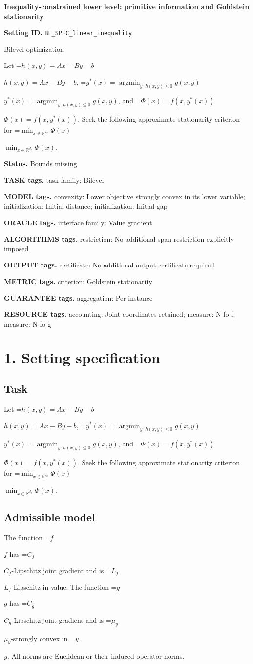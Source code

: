 \documentclass[10pt,a4paper]{article}
\newcommand{\AtlasMath}[1]{\par\begingroup\centering\setbox0=\hbox{$\displaystyle #1$}\ifdim\wd0>1.4\linewidth\typeout{ATLAS WIDE FORMULA: \the\wd0}\fi\ifdim\wd0>\linewidth\resizebox{\linewidth}{!}{\box0}\else\box0\fi\par\endgroup}
\newcommand{\AtlasInlineMath}[1]{\begingroup\setbox0=\hbox{$#1$}\ifdim\wd0>.4\linewidth\endgroup\AtlasMath{#1}\else\endgroup$#1$\fi}
\begin{document}
\raggedright

{\LARGE\bfseries\sffamily\color{AtlasNavy} Inequality-constrained lower level: primitive information and Goldstein stationarity\par}\vspace{5pt}
\textbf{Setting ID.} \texttt{BL\_\allowbreak{}SPEC\_\allowbreak{}linear\_\allowbreak{}inequality}

Bilevel optimization

Let \AtlasInlineMath{h(x,y)=Ax-By-b}, \AtlasInlineMath{y^*(x)=\operatorname*{argmin}_{y:\,h(x,y)\le0}g(x,y)}, and \AtlasInlineMath{\Phi(x)=f(x,y^*(x))}. Seek the following approximate stationarity criterion for \AtlasInlineMath{\min_{x\in \mathbb{R}^{d_x}}\Phi(x)}.

\textbf{Status.} Bounds missing

\textbf{TASK tags.} task family: Bilevel

\textbf{MODEL tags.} convexity: Lower objective strongly convex in its lower variable; initialization: Initial distance; initialization: Initial gap

\textbf{ORACLE tags.} interface family: Value gradient

\textbf{ALGORITHMS tags.} restriction: No additional span restriction explicitly imposed

\textbf{OUTPUT tags.} certificate: No additional output certificate required

\textbf{METRIC tags.} criterion: Goldstein stationarity

\textbf{GUARANTEE tags.} aggregation: Per instance

\textbf{RESOURCE tags.} accounting: Joint coordinates retained; measure: N fo f; measure: N fo g

\section{1. Setting specification}
\subsection{Task}
Let \AtlasInlineMath{h(x,y)=Ax-By-b}, \AtlasInlineMath{y^*(x)=\operatorname*{argmin}_{y:\,h(x,y)\le0}g(x,y)}, and \AtlasInlineMath{\Phi(x)=f(x,y^*(x))}. Seek the following approximate stationarity criterion for \AtlasInlineMath{\min_{x\in \mathbb{R}^{d_x}}\Phi(x)}.

\subsection{Admissible model}
The function \AtlasInlineMath{f} has \AtlasInlineMath{C_f}-Lipschitz joint gradient and is \AtlasInlineMath{L_f}-Lipschitz in value. The function \AtlasInlineMath{g} has \AtlasInlineMath{C_g}-Lipschitz joint gradient and is \AtlasInlineMath{\mu_y}-strongly convex in \AtlasInlineMath{y}. All norms are Euclidean or their induced operator norms.
\end{document}

